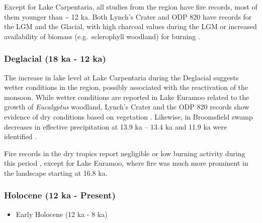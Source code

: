 \documentclass[
  12pt,
]{book}
\providecommand{\tightlist}{%
  \setlength{\itemsep}{0pt}\setlength{\parskip}{0pt}}
\begin{document}
Except for Lake Carpentaria, all studies from the region have fire records, most of them younger than \textasciitilde{} 12 ka. Both Lynch's Crater and ODP 820 have records for the LGM and the Glacial, with high charcoal values during the LGM \citep{kershawPleistoceneVegetationHumid1994, mossLateQuaternaryMarine2007, kershawCompletePollenRecord2007} or increased availability of biomass (e.g.~sclerophyll woodland) for burning \citep{kershawPleistoceneVegetationHumid1994}.

\hypertarget{deglacial-18-ka---12-ka}{%
\subsubsection{Deglacial (18 ka - 12 ka)}\label{deglacial-18-ka---12-ka}}

The increase in lake level at Lake Carpentaria during the Deglacial suggests wetter conditions in the region, possibly associated with the reactivation of the monsoon. While wetter conditions are reported in Lake Euramoo related to the growth of \emph{Eucalyptus} woodland, Lynch's Crater and the ODP 820 records show evidence of dry conditions based on vegetation \citep{kershawQuantitativePalaeoclimaticEstimates1988, mossLateQuaternaryMarine2007, turneyMillennialOrbitalVariations2004a, kershawCompletePollenRecord2007}. Likewise, in Broomsfield swamp decreases in effective precipitation at 13.9 ka -- 13.4 ka and 11.9 ka were identified \citep{burrowsNewLateQuaternary2016a}.

Fire records in the dry tropics report negligible or low burning activity during this period \citep{roweHoloceneSavannaDynamics2019, fieldLateQuaternaryRecord2017}, except for Lake Euramoo, where fire was much more prominent in the landscape starting at 16.8 ka.

\hypertarget{holocene-12-ka---present}{%
\subsubsection{Holocene (12 ka - Present)}\label{holocene-12-ka---present}}

\begin{itemize}
\tightlist
\item
  Early Holocene (12 ka - 8 ka)
\end{itemize}
\end{document}
